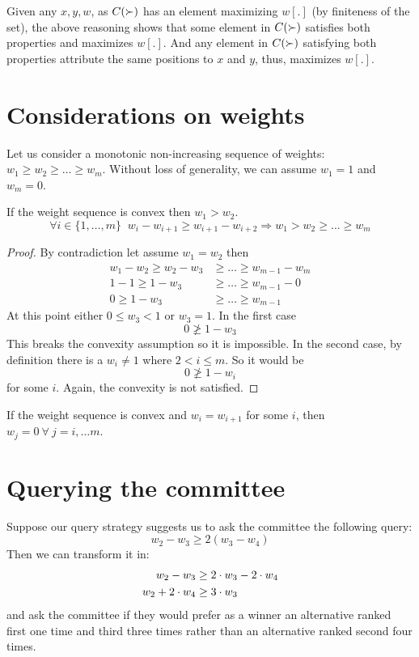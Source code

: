 Given any $x, y, w$, as $C(\succ)$ has an element maximizing $w[.]$ (by finiteness of the set), the above reasoning shows that some element in $C(\succ)$ satisfies both properties and maximizes $w[.]$. And any element in $C(\succ)$ satisfying both properties attribute the same positions to $x$ and $y$, thus, maximizes $w[.]$.

\section{Considerations on weights}
\label{sec:weights}
Let us consider a monotonic non-increasing sequence of weights: $w_{1} \geq w_{2} \geq \ldots \geq w_{m}$. Without loss of generality, we can assume $w_1=1$ and $w_m=0$.

\begin{claim}
	\label{clm:wsequence}
	If the weight sequence is convex then $w_{1} > w_{2}$.
	\[\forall i \in \{1,\ldots,m\} \;\; w_i - w_{i+1} \geq w_{i+1}-w_{i+2} \Rightarrow w_{1} > w_{2} \geq \ldots \geq w_{m}\] 
\end{claim}
\begin{proof}
	By contradiction let assume $w_{1} = w_{2}$ then 
	\begin{align*}
	w_{1} - w_{2} \geq w_{2} - w_{3} &\geq \dots \geq w_{m-1} - w_{m} \\
	1 - 1 \geq 1 - w_{3} &\geq \dots \geq w_{m-1} - 0 \\
	0 \geq 1 - w_{3} &\geq \dots \geq w_{m-1}
	\end{align*}
	At this point either $0\leq w_{3}<1$ or $w_{3}=1$. In the first case 
	\[0 \ngeq 1 - w_{3}\]
	This breaks the convexity assumption so it is impossible.
	In the second case, by definition there is a $w_{i} \neq 1$ where $2 < i \leq m$. So it would be 
	\[0 \ngeq 1 - w_{i}\]
	for some $i$. Again, the convexity is not satisfied.
\end{proof}

\begin{corollary}
	\label{cor:weq}
	If the weight sequence is convex and $w_{i} = w_{i+1}$ for some $i$, then $w_{j}=0 \ \forall \
	j=i, \dots m$.
\end{corollary}


\section{Querying the committee}
Suppose our query strategy suggests us to ask the committee the following query:
\[ w_{2} - w_{3} \geq 2(w_{3} - w_{4}) \]
Then we can transform it in:
\begin{align}
\label{eqn:juryquery}
w_{2} - w_{3} &\geq 2 \cdot w_{3} - 2 \cdot w_{4} \notag \\
w_{2} + 2 \cdot w_{4} &\geq 3 \cdot w_{3} 
\end{align}
and ask the committee if they would prefer as a winner an alternative ranked first one time and third three times rather than an alternative ranked second four times.


